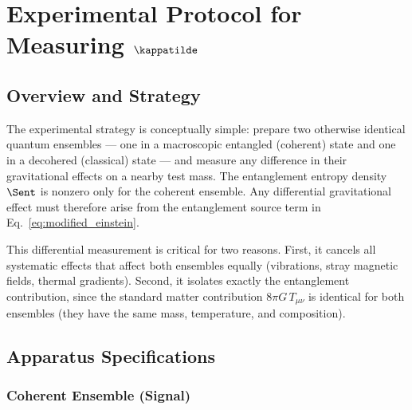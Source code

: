 %

\section{Experimental Protocol for Measuring $\kappatilde$}
\label{sec:experimental}

\subsection{Overview and Strategy}
\label{subsec:overview}

The experimental strategy is conceptually simple: prepare two otherwise
identical quantum ensembles --- one in a macroscopic entangled (coherent)
state and one in a decohered (classical) state --- and measure any
difference in their gravitational effects on a nearby test mass. The
entanglement entropy density $\Sent$ is nonzero only for the coherent
ensemble. Any differential gravitational effect must therefore arise from
the entanglement source term in Eq.~\eqref{eq:modified_einstein}.

This differential measurement is critical for two reasons. First, it
cancels all systematic effects that affect both ensembles equally
(vibrations, stray magnetic fields, thermal gradients). Second, it
isolates exactly the entanglement contribution, since the standard
matter contribution $8\pi G\,T_{\mu\nu}$ is identical for both ensembles
(they have the same mass, temperature, and composition).

\subsection{Apparatus Specifications}
\label{subsec:apparatus}

\subsubsection{Coherent Ensemble (Signal)}

